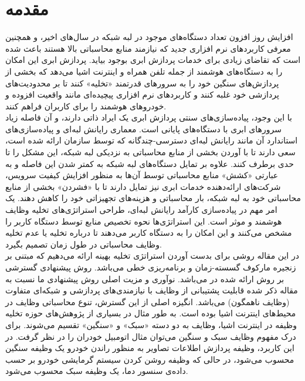 \chapter{مقدمه} 
افزایش روز افزون تعداد دستگاه‌های موجود در لبه شبکه در سال‌های اخیر، و همچنین معرفی کاربردهای نرم افزاری جدید که نیازمند منابع محاسباتی بالا هستند باعث شده است که تقاضای زیادی برای خدمات پردازش ابری بوجود بیاید. پردازش ابری این امکان را به دستگاه‌های هوشمند از جمله تلفن همراه و اینترنت اشیا می‌دهد که بخشی از پردازش‌های سنگین خود را به سرورهای قدرتمند «تخلیه» کنند تا بر محدودیت‌های پردازشی خود غلبه کنند و کاربردهای نرم افزاری پیچیده‌ای مانند واقعیت افزوده و خودروهای هوشمند را برای کاربران فراهم کنند. \\

با این وجود، پیاده‌سازی‌های سنتی پردازش ابری یک ایراد ذاتی دارند، و آن فاصله زیاد سرورهای ابری با دستگاه‌های پایانی است. معماری رایانش لبه‌ای و پیاده‌سازی‌های استاندارد آن مانند رایانش لبه‌ای دسترسی-چندگانه که توسط سازمان  ارائه شده است، سعی دارند تا با آوردن بخشی از منابع محاسباتی به نزدیکی لبه شبکه، این مشکل را تا حدی برطرف کنند. علاوه بر تمایل دستگاه‌های لبه شبکه به کمتر شدن این فاصله و به عبارتی «کشش» منابع محاسباتی توسط آن‌ها به منظور افزایش کیفیت سرویس، شرکت‌های ارائه‌دهنده خدمات ابری نیز تمایل دارند تا با «فشردن» بخشی از منابع محاسباتی خود به لبه شبکه، بار محاسباتی و هزینه‌های تجهیزاتی خود را کاهش دهند. \cite{edgevisions}
\newpage
یک امر مهم در پیاده‌سازی کارآمد رایانش لبه‌ای، طراحی استراتژی‌های تخلیه وظایف هوشمند و موثر است. این استراتژی‌ها نحوه تخصیص منابع توسط دستگاه کاربر را مشخص می‌کنند و این امکان را به دستگاه کاربر می‌دهند تا درباره تخلیه یا عدم تخلیه وظایف محاسباتی در طول زمان تصمیم بگیرد. \\

در این مقاله روشی برای بدست آوردن استراتژی تخلیه بهینه ارائه می‌دهیم که مبتنی بر زنجیره مارکوف گسسته-زمان و برنامه‌ریزی خطی می‌باشد. روش پیشنهادی گسترشی بر روش ارائه شده در \cite{Liu} می‌باشد. نوآوری و مزیت اصلی روش پیشنهادی ما نسبت به مقاله ذکر شده قابلیت پشتیبانی از وظایف با نیازمندی‌های پردازشی و شبکه‌ای متفاوت (وظایف ناهمگون) می‌باشد. انگیزه اصلی از این گسترش، تنوع محاسباتی وظایف در محیط‌های اینترنت اشیا بوده است. به طور مثال در بسیاری از پژوهش‌های حوزه تخلیه وظیفه در اینترنت اشیا، وظایف به دو دسته «سبک» و «سنگین» تقسیم می‌شوند. \cite{yousefpour} \cite{tran} برای درک مفهوم وظایف سبک و سنگین می‌توان مثال اتومبیل خودران را در نظر گرفت. در این کاربرد، وظیفه پردازش اطلاعات تصاویر به منظور راندن خودرو یک وظیفه سنگین محسوب می‌شود، در حالی که وظیفه‌ روشن کردن سیستم گرمایشی خودرو بر حسب داده‌ی سنسور دما، یک وظیفه سبک محسوب می‌شود. \\

